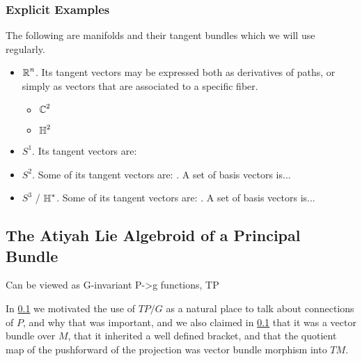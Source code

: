 \subsubsection{Explicit Examples}

The following are manifolds and their tangent bundles which we will use regularly.

\begin{itemize}
    \item $\operatorname{\mathbb{R}}^n$. Its tangent vectors may be expressed both as derivatives of paths, or simply as vectors that are associated to a specific fiber.
    \begin{itemize}
        \item $\operatorname{\mathbb{C}}^2$
        \item $\operatorname{\mathbb{H}}^2$
    \end{itemize}
    \item $S^1$. Its tangent vectors are:
    \item $S^2$. Some of its tangent vectors are: . A set of basis vectors is...
    \item $S^3$ / $\operatorname{\mathbb{H}}^*$. Some of its tangent vectors are: . A set of basis vectors is...
\end{itemize}

\subsection{The Atiyah Lie Algebroid of a Principal Bundle}

Can be viewed as G-invariant P->g functions, TP 

In \ref{} we motivated the use of $TP/G$ as a natural place to talk about connections of $P$, and why that was important, and we also claimed in \ref{} that it was a vector bundle over $M$, that it inherited a well defined bracket, and that the quotient map of the pushforward of the projection was vector bundle morphism into $TM$.

